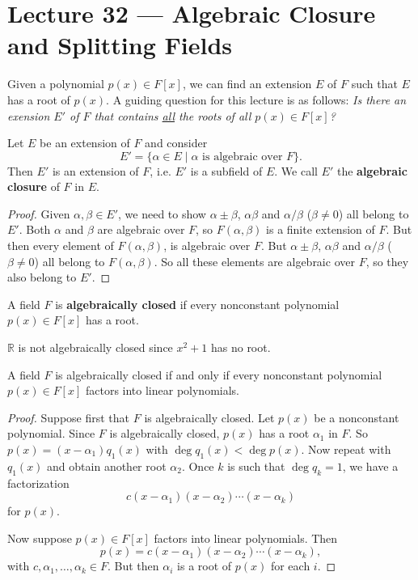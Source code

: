 \section{Lecture 32 — Algebraic Closure and Splitting Fields}

Given a polynomial $p(x)\in F[x]$, we can find an extension $E$ of $F$ such that $E$ has a root of $p(x)$. A guiding question for this lecture is as follows: \textit{Is there an exension $E'$ of $F$ that contains \underline{all} the roots of all $p(x)\in F[x]$?}

\begin{theorem}
	Let $E$ be an extension of $F$ and consider
	$$E'=\{\alpha\in E\mid\text{$\alpha$ is algebraic over $F$}\}.$$
	Then $E'$ is an extension of $F$, i.e. $E'$ is a subfield of $E$. We call $E'$ the \textbf{algebraic closure} of $F$ in $E$.
\end{theorem}

\begin{proof}
	Given $\alpha,\beta\in E'$, we need to show $\alpha\pm\beta$, $\alpha\beta$ and $\alpha/\beta$ ($\beta\neq 0$) all belong to $E'$. Both $\alpha$ and $\beta$ are algebraic over $F$, so $F(\alpha,\beta)$ is a finite extension of $F$. But then every element of $F(\alpha,\beta)$, is algebraic over $F$. But $\alpha\pm\beta$, $\alpha\beta$ and $\alpha/\beta$ ($\beta\neq 0$) all belong to $F(\alpha,\beta)$. So all these elements are algebraic over $F$, so they also belong to $E'$.
\end{proof}

\begin{definition}
	A field $F$ is \textbf{algebraically closed} if every nonconstant polynomial $p(x)\in F[x]$ has a root.
\end{definition}

\begin{example}
	$\mathbb R$ is not algebraically closed since $x^2+1$ has no root.
\end{example}

\begin{theorem}
	A field $F$ is algebraically closed if and only if every nonconstant polynomial $p(x)\in F[x]$ factors into linear polynomials.
\end{theorem}

\begin{proof}
	Suppose first that $F$ is algebraically closed. Let $p(x)$ be a nonconstant polynomial. Since $F$ is algebraically closed, $p(x)$ has a root $\alpha_1$ in $F$. So $p(x)=(x-\alpha_1)q_1(x)$ with $\deg q_1(x)<\deg p(x)$. Now repeat with $q_1(x)$ and obtain another root $\alpha_2$. Once $k$ is such that $\deg q_k=1$, we have a factorization
	$$c(x-\alpha_1)(x-\alpha_2)\cdots(x-\alpha_k)$$
	for $p(x)$.

	Now suppose $p(x)\in F[x]$ factors into linear polynomials. Then
	$$p(x)=c(x-\alpha_1)(x-\alpha_2)\cdots(x-\alpha_k),$$
	with $c,\alpha_1,\hdots,\alpha_k\in F$. But then $\alpha_i$ is a root of $p(x)$ for each $i$.
\end{proof}

